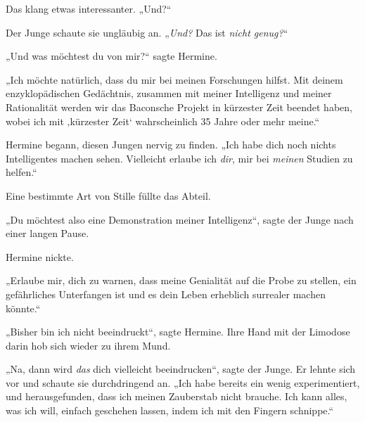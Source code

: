 Das klang etwas interessanter.
„Und?“

Der Junge schaute sie ungläubig an.
„\emph{Und?} Das ist \emph{nicht genug?}“

„Und was möchtest du von mir?“ sagte Hermine.

„Ich möchte natürlich, dass du mir bei meinen Forschungen hilfst. Mit deinem enzyklopädischen Gedächtnis, zusammen mit meiner Intelligenz und meiner Rationalität werden wir das Baconsche Projekt in kürzester Zeit beendet haben, wobei ich mit ‚kürzester Zeit‘ wahrscheinlich 35 Jahre oder mehr meine.“

Hermine begann, diesen Jungen nervig zu finden.
„Ich habe dich noch nichts Intelligentes machen sehen. Vielleicht erlaube ich \emph{dir}, mir bei \emph{meinen} Studien zu helfen.“

Eine bestimmte Art von Stille füllte das Abteil.

„Du möchtest also eine Demonstration meiner Intelligenz“, sagte der Junge nach einer langen Pause.

Hermine nickte.

„Erlaube mir, dich zu warnen, dass meine Genialität auf die Probe zu stellen, ein gefährliches Unterfangen ist und es dein Leben erheblich surrealer machen könnte.“

„Bisher bin ich nicht beeindruckt“, sagte Hermine. Ihre Hand mit der Limodose darin hob sich wieder zu ihrem Mund.

„Na, dann wird \emph{das} dich vielleicht beeindrucken“, sagte der Junge. Er lehnte sich vor und schaute sie durchdringend an.
„Ich habe bereits ein wenig experimentiert, und herausgefunden, dass ich meinen Zauberstab nicht brauche. Ich kann alles, was ich will, einfach geschehen lassen, indem ich mit den Fingern schnippe.“

